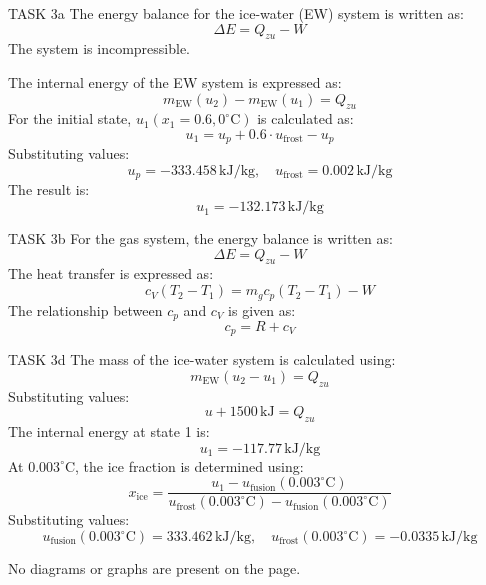 TASK 3a  
The energy balance for the ice-water (EW) system is written as:  
\[
\Delta E = Q_{zu} - W
\]  
The system is incompressible.  

The internal energy of the EW system is expressed as:  
\[
m_{\text{EW}}(u_2) - m_{\text{EW}}(u_1) = Q_{zu}
\]  
For the initial state, \( u_1(x_1 = 0.6, 0^\circ\text{C}) \) is calculated as:  
\[
u_1 = u_p + 0.6 \cdot u_{\text{frost}} - u_p
\]  
Substituting values:  
\[
u_p = -333.458 \, \text{kJ/kg}, \quad u_{\text{frost}} = 0.002 \, \text{kJ/kg}
\]  
The result is:  
\[
u_1 = -132.173 \, \text{kJ/kg}
\]  

TASK 3b  
For the gas system, the energy balance is written as:  
\[
\Delta E = Q_{zu} - W
\]  
The heat transfer is expressed as:  
\[
c_V(T_2 - T_1) = m_g c_p(T_2 - T_1) - W
\]  
The relationship between \( c_p \) and \( c_V \) is given as:  
\[
c_p = R + c_V
\]  

TASK 3d  
The mass of the ice-water system is calculated using:  
\[
m_{\text{EW}}(u_2 - u_1) = Q_{zu}
\]  
Substituting values:  
\[
u + 1500 \, \text{kJ} = Q_{zu}
\]  
The internal energy at state 1 is:  
\[
u_1 = -117.77 \, \text{kJ/kg}
\]  
At \( 0.003^\circ\text{C} \), the ice fraction is determined using:  
\[
x_{\text{ice}} = \frac{u_1 - u_{\text{fusion}}(0.003^\circ\text{C})}{u_{\text{frost}}(0.003^\circ\text{C}) - u_{\text{fusion}}(0.003^\circ\text{C})}
\]  
Substituting values:  
\[
u_{\text{fusion}}(0.003^\circ\text{C}) = 333.462 \, \text{kJ/kg}, \quad u_{\text{frost}}(0.003^\circ\text{C}) = -0.0335 \, \text{kJ/kg}
\]  

No diagrams or graphs are present on the page.
